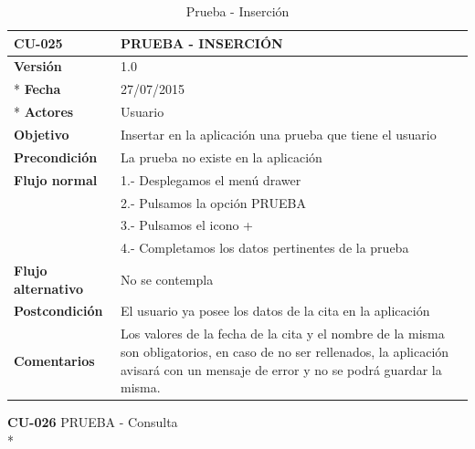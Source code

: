 \documentclass[../pfc.tex]{subfiles}
\begin{document}
	\begin{table}[H]
		\centering
		\begin{tabular}[t]{|p{3cm}|p{9.5cm}|}
			\hline \textbf{CU-025} & \textbf{PRUEBA - INSERCIÓN} \\*
			\hline\hline \textbf{Versión} & 1.0 \\ *
			\hline\hline \textbf{Fecha} & 27/07/2015 \\ *
			\hline\textbf{Actores} 	& Usuario\\*
			\hline \textbf{Objetivo} & Insertar en la aplicación una prueba que tiene el usuario\\* 			
			\hline \textbf{Precondición} & La prueba no existe en la aplicación\\* 
			\hline \textbf{Flujo normal} & 1.- Desplegamos el menú drawer \\* 
			& 2.- Pulsamos la opción PRUEBA\\*	
			& 3.- Pulsamos el icono +\\*	
			& 4.- Completamos los datos pertinentes de la prueba\\*	
			\hline \textbf{Flujo alternativo} & No se contempla \\* 
			\hline \textbf{Postcondición} & El usuario ya posee los datos de la cita en la aplicación \\* 
			\hline \textbf{Comentarios}   & Los valores de la fecha de la cita y el nombre de la misma son obligatorios, en caso de no ser rellenados, la aplicación avisará con un mensaje de error y no se podrá guardar la misma.\\*
			\hline
		\end{tabular}
		\caption{Prueba - Inserción}
		\label{tabla:caso025}
	\end{table}
	
	\textbf{CU-026}	PRUEBA - Consulta\\*
	
\end{document}
